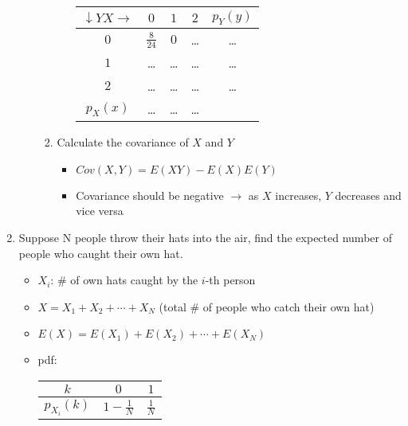 \documentclass[12pt]{article}
\begin{document}
\begin{enumerate}
\begin{itemize}
\begin{enumerate}
\begin{itemize}
\begin{tabular}{|c|c|c|c|c|}
                            \hline
                            $\downarrow Y X \rightarrow$ & $0$ & $1$ & $2$ & $p_Y(y)$ \\
                            \hline
                            $0$ & $\frac{8}{24}$ & $0$ & \ldots & \ldots \\
                            \hline
                            $1$ & \ldots & \ldots & \ldots & \ldots \\
                            \hline
                            $2$ & \ldots & \ldots & \ldots & \ldots \\
                            \hline
                            $p_X(x)$ & \ldots & \ldots & \ldots & \\
                            \hline
                        \end{tabular}
                    \end{itemize}
                    \item Calculate the covariance of $X$ and $Y$
                    \begin{itemize}
                        \item $Cov(X, Y) = E(XY) - E(X)E(Y)$
                        \item Covariance should be negative $\rightarrow$ as $X$ increases, $Y$ decreases and vice versa
                    \end{itemize}
                \end{enumerate}
            \end{itemize}
            \item Suppose N people throw their hats into the air, find the expected number of people who caught their own hat.
            \begin{itemize}
                \item $X_i$: \# of own hats caught by the $i$-th person
                \item $X = X_1 + X_2 + \cdots + X_N$ (total \# of people who catch their own hat)
                \item $E(X) = E(X_1) + E(X_2) + \cdots + E(X_N)$
                \item pdf:
                \begin{tabular}{|c|c|c|}
                    \hline
                    $k$ & $0$ & $1$ \\
                    \hline
                    $p_{X_i}(k)$ & $1 - \frac{1}{N}$ & $\frac{1}{N}$ \\
                    \hline

\end{tabular}
\end{itemize}
\end{enumerate}
\end{document}
